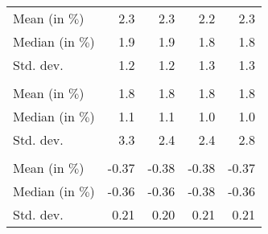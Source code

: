 \begin{tabular}{lllll}
\multicolumn{1}{l}{\hspace{2em}Mean (in $\%$)} &
  \multicolumn{1}{|r}{2.3} &
  \multicolumn{1}{r}{2.3} &
  \multicolumn{1}{r}{2.2} &
  \multicolumn{1}{r}{2.3} \\
\multicolumn{1}{l}{\hspace{2em}Median (in $\%$)} &
  \multicolumn{1}{|r}{1.9} &
  \multicolumn{1}{r}{1.9} &
  \multicolumn{1}{r}{1.8} &
  \multicolumn{1}{r}{1.8} \\
\multicolumn{1}{l}{\hspace{2em}Std. dev.} &
  \multicolumn{1}{|r}{1.2} &
  \multicolumn{1}{r}{1.2} &
  \multicolumn{1}{r}{1.3} &
  \multicolumn{1}{r}{1.3} \\
\multicolumn{1}{l}{\hspace{1em}{\textit{Additive term} ($\widehat{t}/\widetilde{p}$)}} &
  \multicolumn{1}{|r}{} &
  \multicolumn{1}{r}{} &
  \multicolumn{1}{r}{} &
  \multicolumn{1}{r}{} \\
\multicolumn{1}{l}{\hspace{2em}Mean (in $\%$)} &
  \multicolumn{1}{|r}{1.8} &
  \multicolumn{1}{r}{1.8} &
  \multicolumn{1}{r}{1.8} &
  \multicolumn{1}{r}{1.8} \\
\multicolumn{1}{l}{\hspace{2em}Median (in $\%$)} &
  \multicolumn{1}{|r}{1.1} &
  \multicolumn{1}{r}{1.1} &
  \multicolumn{1}{r}{1.0} &
  \multicolumn{1}{r}{1.0} \\
\multicolumn{1}{l}{\hspace{2em}Std. dev.} &
  \multicolumn{1}{|r}{3.3} &
  \multicolumn{1}{r}{2.4} &
  \multicolumn{1}{r}{2.4} &
  \multicolumn{1}{r}{2.8} \\
\multicolumn{1}{l}{\hspace{1em}{\textit{Elasticity} ($\widehat{\beta}$)}} &
  \multicolumn{1}{|r}{} &
  \multicolumn{1}{r}{} &
  \multicolumn{1}{r}{} &
  \multicolumn{1}{r}{} \\
\multicolumn{1}{l}{\hspace{2em}Mean (in $\%$)} &
  \multicolumn{1}{|r}{-0.37} &
  \multicolumn{1}{r}{-0.38} &
  \multicolumn{1}{r}{-0.38} &
  \multicolumn{1}{r}{-0.37} \\
\multicolumn{1}{l}{\hspace{2em}Median (in $\%$)} &
  \multicolumn{1}{|r}{-0.36} &
  \multicolumn{1}{r}{-0.36} &
  \multicolumn{1}{r}{-0.38} &
  \multicolumn{1}{r}{-0.36} \\
\multicolumn{1}{l}{\hspace{2em}Std. dev.} &
  \multicolumn{1}{|r}{0.21} &
  \multicolumn{1}{r}{0.20} &
  \multicolumn{1}{r}{0.21} &
  \multicolumn{1}{r}{0.21} \\
\cline{1-5}
\end{tabular}
